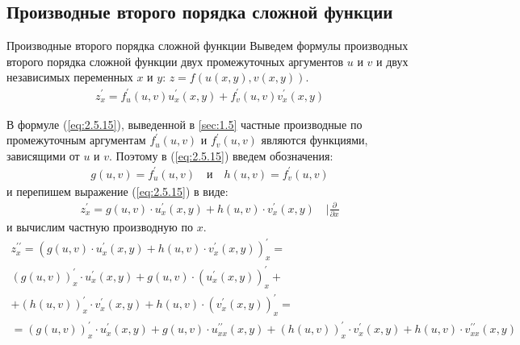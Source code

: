 
\subsection{Производные второго порядка сложной функции}

\begin{tbox}{Производные второго порядка сложной функции}
	Выведем формулы производных второго порядка сложной функции двух промежуточных аргументов $u$ и $v$ и двух независимых переменных $x$ и $y$: \(z = f(u(x,y), v(x,y))\).
	\begin{align} \label{eq:2.5.15}
		z^{\prime}_x = f_u^{\prime}(u, v) u^{\prime}_x(x,y) + f^{\prime}_v(u, v)v^{\prime}_x(x,y)
	\end{align}

	В формуле (\ref{eq:2.5.15}), выведенной в \cref{sec:1.5} частные производные по промежуточным аргументам $f_u^{\prime}(u, v)$ и $f_v^{\prime}(u, v)$ являются функциями, зависящими от $u$ и $v$. Поэтому в (\ref{eq:2.5.15}) введем обозначения:
	\begin{align} \label{eq:2.5.16}
		g(u, v) = f^{\prime}_u(u,v) \quad \text{и} \quad h(u, v) = f^{\prime}_v(u,v)
	\end{align}
	и перепишем выражение (\ref{eq:2.5.15}) в виде:
	\begin{align} \label{eq:2.5.17}
		z_x^{\prime} = g(u,v) \cdot u^{\prime}_x(x,y) + h(u,v) \cdot v_x^{\prime}(x,y) \quad |\textstyle\frac{\partial}{\partial x}
	\end{align}
	и вычислим частную производную по $x$.
	\begin{gather*}
		z^{\prime\prime}_x = (g(u,v) \cdot u_x^{\prime}(x,y) + h(u,v) \cdot v_x^{\prime}(x,y))_x^{\prime} =\\
		(g(u, v))^{\prime}_x \cdot u_x^{\prime}(x, y) + g(u,v) \cdot (u_x^{\prime}(x,y))^{\prime}_x + \\ + (h(u,v))^{\prime}_x \cdot v_{x}^{\prime}(x, y) + h(u, v) \cdot (v_x^{\prime}(x, y))^{\prime}_x = \\ =
		(g(u,v))^{\prime}_x \cdot u_x^{\prime}(x,y) + g(u, v) \cdot u_{xx}^{\prime\prime}(x,y) + (h(u,v))_x^{\prime} \cdot v_x^{\prime}(x,y) + h(u, v) \cdot v_{xx}^{\prime\prime}(x,y)
	\end{gather*}


\end{tbox}
